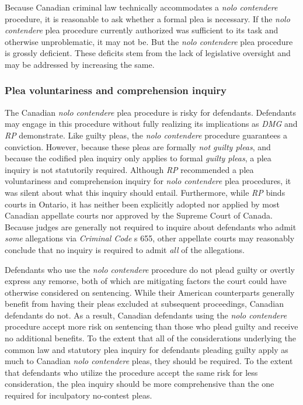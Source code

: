 Because Canadian criminal law technically accommodates a \textit{nolo contendere} procedure, it is reasonable to ask whether a formal plea is necessary. If the \textit{nolo contendere} plea procedure currently authorized was sufficient to its task and otherwise unproblematic, it may not be. But the \textit{nolo contendere} plea procedure is grossly deficient. These deficits stem from the lack of legislative oversight and may be addressed by increasing the same.

\subsubsection{Plea voluntariness and comprehension inquiry}

The Canadian \textit{nolo contendere} plea procedure is risky for defendants. Defendants may engage in this procedure without fully realizing its implications as \textit{DMG} and \textit{RP} demonstrate. Like guilty pleas, the \textit{nolo contendere} procedure guarantees a conviction. However, because these pleas are formally \textit{not guilty pleas}, and because the codified plea inquiry only applies to formal \textit{guilty pleas}, a plea inquiry is not statutorily required. Although \textit{RP} recommended a plea voluntariness and comprehension inquiry for \textit{nolo contendere} plea procedures, it was silent about what this inquiry should entail. Furthermore, while \textit{RP} binds courts in Ontario, it has neither been explicitly adopted nor applied by most Canadian appellate courts nor approved by the Supreme Court of Canada. Because judges are generally not required to inquire about defendants who admit \textit{some} allegations via \textit{Criminal Code} s 655, other appellate courts may reasonably conclude that no inquiry is required to admit \textit{all} of the allegations. 

Defendants who use the \textit{nolo contendere} procedure do not plead guilty or overtly express any remorse, both of which are mitigating factors the court could have otherwise considered on sentencing. While their American counterparts generally benefit from having their pleas excluded at subsequent proceedings, Canadian defendants do not. As a result, Canadian defendants using the \textit{nolo contendere} procedure accept more risk on sentencing than those who plead guilty and receive no additional benefits. To the extent that all of the considerations underlying the common law and statutory plea inquiry for defendants pleading guilty apply as much to Canadian \textit{nolo contendere} pleas, they should be required. To the extent that defendants who utilize the procedure accept the same risk for less consideration, the plea inquiry should be more comprehensive than the one required for inculpatory no-contest pleas.

